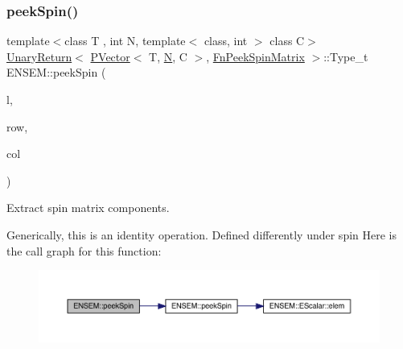 \subsubsection{\texorpdfstring{peekSpin()}{peekSpin()}\hspace{0.1cm}{\footnotesize\ttfamily [2/2]}}
{\footnotesize\ttfamily template$<$class T , int N, template$<$ class, int $>$ class C$>$ \\
\mbox{\hyperlink{structENSEM_1_1UnaryReturn}{Unary\+Return}}$<$ \mbox{\hyperlink{classENSEM_1_1PVector}{P\+Vector}}$<$ T, \mbox{\hyperlink{operator__name__util_8cc_a7722c8ecbb62d99aee7ce68b1752f337}{N}}, C $>$, \mbox{\hyperlink{structENSEM_1_1FnPeekSpinMatrix}{Fn\+Peek\+Spin\+Matrix}} $>$\+::Type\+\_\+t E\+N\+S\+E\+M\+::peek\+Spin (\begin{DoxyParamCaption}\item[{const \mbox{\hyperlink{classENSEM_1_1PVector}{P\+Vector}}$<$ T, \mbox{\hyperlink{operator__name__util_8cc_a7722c8ecbb62d99aee7ce68b1752f337}{N}}, C $>$ \&}]{l,  }\item[{int}]{row,  }\item[{int}]{col }\end{DoxyParamCaption})\hspace{0.3cm}{\ttfamily [inline]}}



Extract spin matrix components. 

Generically, this is an identity operation. Defined differently under spin Here is the call graph for this function\+:\nopagebreak
\begin{figure}[H]
\begin{center}
\leavevmode
\includegraphics[width=350pt]{d3/dc4/group__primvector_ga5461f8956839af7e7079b717601376a7_cgraph}
\end{center}
\end{figure}
\mbox{\label{group__primvector_ga8643fc63839f4ef1bdbb168de2385c5e}} 
